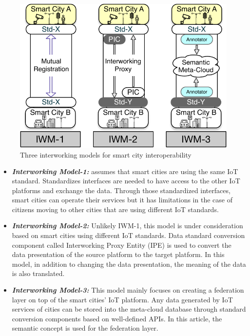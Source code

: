 \begin{figure}[H]			%
	\centering
	\includegraphics[width=\textwidth]{figures/fig_three_approaches_of_interworking.pdf}
    \caption{Three interworking models for smart city interoperability}
    \label{fig:three_interworkingmodel_for_smartcities}
\end{figure}

\begin{itemize}
  \item \textbf{\textit{Interworking Model-1:}} assumes that smart cities are using the same IoT standard. Standardizes interfaces are needed to have access to the other IoT platforms and exchange the data. Through those standardized interfaces, smart cities can operate their services but it has limitations in the case of citizens moving to other cities that are using different IoT standards.
  
  \item \textbf{\textit{Interworking Model-2:}} Unlikely IWM-1, this model is under consideration based on smart cities using different IoT standards. Data standard conversion component called Interworking Proxy Entity (IPE) is used to convert the data presentation of the source platform to the target platform. In this model, in addition to changing the data presentation, the meaning of the data is also translated.
  
  \item \textbf{\textit{Interworking Model-3:}} This model mainly focuses on creating a federation layer on top of the smart cities’ IoT platform. Any data generated by IoT services of cities can be stored into the meta-cloud database through standard conversion components based on well-defined APIs. In this article, the semantic concept is used for the federation layer.
\end{itemize}

